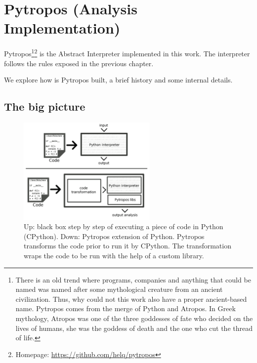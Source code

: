 \chapter{Pytropos (Analysis Implementation)}%
\label{pytropos-analysis-implementation}

Pytropos\footnote{There is an old trend where programs, companies and
  anything that could be named was named after some mythological
  creature from an ancient civilization. Thus, why could not this work
  also have a proper ancient-based name. Pytropos comes from the merge
  of Python and Atropos. In Greek mythology, Atropos was one of the
  three goddesses of fate who decided on the lives of humans, she was
  the goddess of death and the one who cut the thread of life.}\footnote{
  Homepage: \url{https://github.com/helq/pytropos}
}
is the Abstract Interpreter implemented in this work. The interpreter follows the rules
exposed in the previous chapter.

We explore how is Pytropos built, a brief history and some internal details.


\section{The big picture}\label{the-big-picture}

\begin{figure}
\begin{center}
  \includegraphics[width=0.6\textwidth]{figures/pytroposimage.png}
\end{center}
\caption{Up: black box step by step of executing a piece of code in Python (CPython). Down:
  Pytropos extension of Python. Pytropos transforms the code prior to run it by CPython.
  The transformation wraps the code to be run with the help of a custom library.
  \label{pytroposinter}}
\end{figure}

